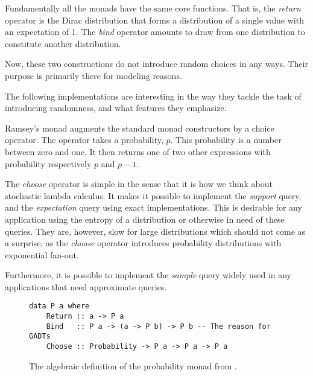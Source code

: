 Fundamentally all the monads have the same core functions. That is, the
\emph{return} operator is the Dirac distribution that forms a distribution of
a single value with an expectation of 1. The \emph{bind} operator amounts to
draw from one distribution to constitute another distribution.

Now, these two constructions do not introduce random choices in any ways.
Their purpose is primarily there for modeling reasons.

The following implementations are interesting in the way they tackle the task
of introducing randomness, and what features they emphasize.




Ramsey's monad \cite{Ramsey:2002} augments the standard monad constructors by
a choice operator. The operator takes a probability, $p$. This 
probability is a number between zero and one. It then returns one of two
other expressions with probability respectively $p$ and $p-1$.

The \emph{choose} operator is simple in the sense that it is how we think
about stochastic lambda calculus. It makes it possible to implement the
\emph{support} query, and the \emph{expectation} query using exact implementations.
This is desirable for any application using the entropy of a distribution or
otherwise in need of these queries. They are, however, slow for
large distributions which should not come as a surprise, as the \emph{choose}
operator introduces probability distributions with exponential fan-out.

Furthermore, it is possible to implement the \emph{sample} query widely
used in any applications that need approximate queries.

\begin{figure}[H]
\begin{verbatim}
data P a where
    Return :: a -> P a
    Bind   :: P a -> (a -> P b) -> P b -- The reason for GADTs
    Choose :: Probability -> P a -> P a -> P a
\end{verbatim}
\caption{The algebraic definition of the probability monad from \cite{Ramsey:2002}.}
\label{code:ramsey-monad}
\end{figure}

